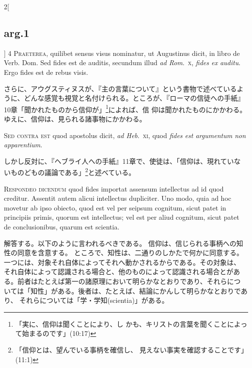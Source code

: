 \documentclass[paper=a4paper,fontsize=10pt,jafontsize=9pt,titlepage]{jlreq}
\begin{document}
\begin{paracol}{2}[\subsection{arg.1}]
{\scshape 4 Praeterea}, quilibet sensus visus nominatur, ut Augustinus
dicit, in libro de Verb. Dom. Sed fides est de auditis, secundum illud
{\itshape ad Rom}.~{\scshape x}, {\itshape fides ex auditu}. Ergo fides
est de rebus visis.

\switchcolumn

さらに、アウグスティヌスが、『主の言葉について』という書物で述べているよ
 うに、どんな感覚も視覚と名付けられる。ところが、『ローマの信徒への手紙』
 10章「聞かれたものから信仰が」\footnote{「実に、信仰は聞くことにより、し
 かも、キリストの言葉を聞くことによって始まるのです」(10:17)}によれば、信
 仰は聞かれたものにかかわる。ゆえに、信仰は、見られる諸事物にかかわる。

\switchcolumn*[\subsection{s.c.}]

{\scshape Sed contra est} quod apostolus dicit, {\itshape ad
 Heb}.~{\scshape xi}, quod {\itshape fides est argumentum non apparentium}.

\switchcolumn

しかし反対に、『ヘブライ人への手紙』11章で、使徒は、「信仰は、現れていな
 いものどもの議論である」\footnote{「信仰とは、望んでいる事柄を確信し、
 見えない事実を確認することです」(11:1)}と述べている。


{\scshape Respondeo dicendum} quod fides importat assensum intellectus ad
id quod creditur. Assentit autem alicui intellectus dupliciter. Uno
modo, quia ad hoc movetur ab ipso obiecto, quod est vel per seipsum
cognitum, sicut patet in principiis primis, quorum est intellectus; vel
est per aliud cognitum, sicut patet de conclusionibus, quarum est
scientia.

\switchcolumn

解答する。以下のように言われるべきである。
信仰は、信じられる事柄への知性の同意を含意する。
ところで、知性は、二通りのしかたで何かに同意する。
一つには、対象それ自体によってそれへ動かされるからである。その対象は、
 それ自体によって認識される場合と、他のものによって認識される場合とがあ
 る。前者はたとえば第一の諸原理において明らかなとおりであり、それらにつ
 いては「知性」がある。後者は、たとえば、結論にかんして明らかなとおりであり、
 それらについては「学・学知(scientia)」がある。


\end{paracol}
\end{document}
